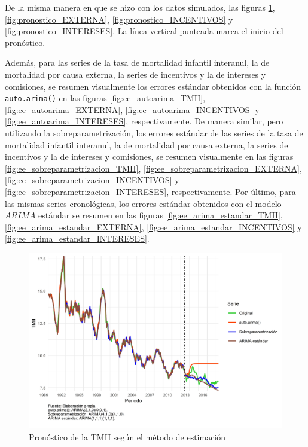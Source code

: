 \documentclass[
]{article}
\begin{document}
De la misma manera en que se hizo con los datos simulados, las figuras
\ref{fig:pronostico_TMII}, \ref{fig:pronostico_EXTERNA},
\ref{fig:pronostico_INCENTIVOS} y \ref{fig:pronostico_INTERESES}. La
línea vertical punteada marca el inicio del pronóstico.

Además, para las series de la tasa de mortalidad infantil interanul, la
de mortalidad por causa externa, la series de incentivos y la de
intereses y comisiones, se resumen visualmente los errores estándar
obtenidos con la función \texttt{auto.arima()} en las figuras
\ref{fig:ee_autoarima_TMII}, \ref{fig:ee_autoarima_EXTERNA},
\ref{fig:ee_autoarima_INCENTIVOS} y \ref{fig:ee_autoarima_INTERESES},
respectivamente. De manera similar, pero utilizando la
sobreparametrización, los errores estándar de las series de la tasa de
mortalidad infantil interanul, la de mortalidad por causa externa, la
series de incentivos y la de intereses y comisiones, se resumen
visualmente en las figuras \ref{fig:ee_sobreparametrizacion_TMII},
\ref{fig:ee_sobreparametrizacion_EXTERNA},
\ref{fig:ee_sobreparametrizacion_INCENTIVOS} y
\ref{fig:ee_sobreparametrizacion_INTERESES}, respectivamente. Por
último, para las mismas series cronológicas, los errores estándar
obtenidos con el modelo \(ARIMA\) estándar se resumen en las figuras
\ref{fig:ee_arima_estandar_TMII}, \ref{fig:ee_arima_estandar_EXTERNA},
\ref{fig:ee_arima_estandar_INCENTIVOS} y
\ref{fig:ee_arima_estandar_INTERESES}.

\begin{figure}[H]
\includegraphics[width=1\linewidth,height=1\textheight]{Tesis_files/figure-latex/pronostico_TMII-1} \caption{Pronóstico de la TMII según el método de estimación}\label{fig:pronostico_TMII}
\end{figure}
\end{document}
